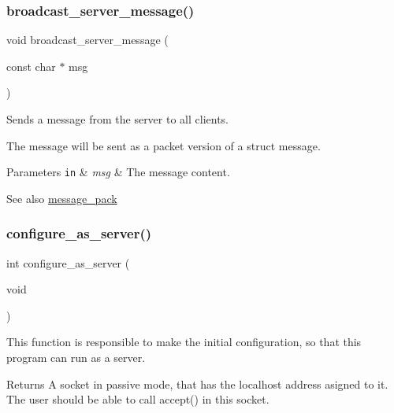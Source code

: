\subsubsection{\texorpdfstring{broadcast\+\_\+server\+\_\+message()}{broadcast\_server\_message()}}
{\footnotesize\ttfamily void broadcast\+\_\+server\+\_\+message (\begin{DoxyParamCaption}\item[{const char $\ast$}]{msg }\end{DoxyParamCaption})}



Sends a message from the server to all clients. 

The message will be sent as a packet version of a struct message.


\begin{DoxyParams}[1]{Parameters}
\mbox{\tt in}  & {\em msg} & The message content.\\
\hline
\end{DoxyParams}
\begin{DoxySeeAlso}{See also}
\hyperlink{message_8h_a0e07715664284f7a821216ca83317e60}{message\+\_\+pack} 
\end{DoxySeeAlso}
\mbox{\label{zip-zop-server_8c_a59ee6eb284b065353164c1aa7d487ce2}} 
\subsubsection{\texorpdfstring{configure\+\_\+as\+\_\+server()}{configure\_as\_server()}}
{\footnotesize\ttfamily int configure\+\_\+as\+\_\+server (\begin{DoxyParamCaption}\item[{void}]{ }\end{DoxyParamCaption})}



This function is responsible to make the initial configuration, so that this program can run as a server. 

\begin{DoxyReturn}{Returns}
A socket in passive mode, that has the localhost address asigned to it. The user should be able to call accept() in this socket. 
\end{DoxyReturn}
\mbox{\label{zip-zop-server_8c_a0ecdeaf556729d827a07915b7a89866c}} 
